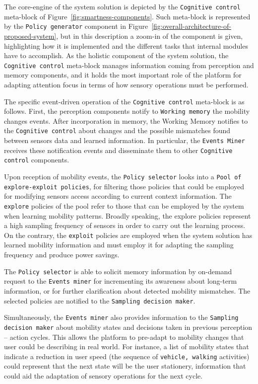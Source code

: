\documentclass[ENG,PhD]{cinvestav}
\begin{document}
The core-engine of the system solution is depicted by the \texttt{Cognitive control} meta-block of Figure~\ref{fig:smartness-components}.
Such meta-block is represented by the \texttt{Policy generator} component in Figure~\ref{fig:overall-architecture-of-proposed-system}, but in this description a zoom-in of the component is given, highlighting how it is implemented and the different tasks that internal modules have to accomplish.
As the holistic component of the system solution, the \texttt{Cognitive control} meta-block manages information coming from perception and memory components, and it holds the most important role of the platform for adapting attention focus in terms of how sensory operations must be performed.

The specific event-driven operation of the \texttt{Cognitive control} meta-block is as follows.
First, the perception components notify to \texttt{Working memory} the mobility changes events.
After incorporation in memory, the Working Memory notifies to the \texttt{Cognitive control} about changes and the possible mismatches found between sensors data and learned information.
In particular, the \texttt{Events Miner} receives these notification events and disseminate them to other \texttt{Cognitive control} components.

Upon reception of mobility events, the \texttt{Policy selector} looks into a \texttt{Pool of explore-exploit policies}, for filtering those policies that could be employed for modifying sensors access according to current context information.
The \texttt{explore} policies of the pool refer to those that can be employed by the system when learning mobility patterns. 
Broadly speaking, the explore policies represent a high sampling frequency of sensors in order to carry out the learning process.
On the contrary, the \texttt{exploit} policies are employed when the system solution has learned mobility information and must employ it for adapting the sampling frequency and produce power savings.

The \texttt{Policy selector} is able to solicit memory information by on-demand request to the \texttt{Events miner} for incrementing its awareness about long-term information, or for further clarification about detected mobility mismatches.
The selected policies are notified to the \texttt{Sampling decision maker}.

Simultaneously, the \texttt{Events miner} also provides information to the \texttt{Sampling decision maker} about mobility states and decisions taken in previous perception -- action cycles.
This allows the platform to pre-adapt to mobility changes that user could be describing in real world\cite{Haykin2014}.
For instance, a list of mobility states that indicate a reduction in user speed (the sequence of \texttt{vehicle, walking} activities) could represent that the next state will be the user stationery, information that could aid the adaptation of sensory operations for the next cycle.
\end{document}
